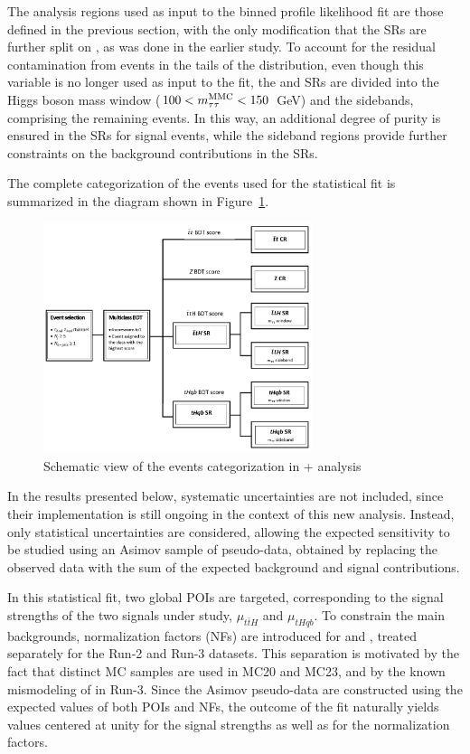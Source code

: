 The analysis regions used as input to the binned profile likelihood fit are those defined in the previous section, with the only modification that the SRs are further split on \mmc, as was done in the earlier study. To account for the residual contamination from \ttbar events in the tails of the \mmc distribution, even though this variable is no longer used as input to the fit, the \ttH and \thqb SRs are divided into the Higgs boson mass window ($100 < m^\text{MMC}_{\tau\tau} < 150$~GeV) and the sidebands, comprising the remaining events. In this way, an additional degree of purity is ensured in the SRs for signal events, while the sideband regions provide further constraints on the background contributions in the SRs.

The complete categorization of the events used for the statistical fit is summarized in the diagram shown in Figure~\ref{analysis_diagram}.
\begin{figure}[htbp]
  \centering
  \includegraphics[width=0.7\textwidth]{images/analysis_diagram.png}
    \caption{Schematic view of the events categorization in \tH + \ttH analysis}
    \label{analysis_diagram}
  \end{figure}

In the results presented below, systematic uncertainties are not included, since their implementation is still ongoing in the context of this new analysis. Instead, only statistical uncertainties are considered, allowing the expected sensitivity to be studied using an Asimov sample of pseudo-data, obtained by replacing the observed data with the sum of the expected background and signal contributions.

In this statistical fit, two global POIs are targeted, corresponding to the signal strengths of the two signals under study, $\mu_{t\bar{t}H}$ and $\mu_{tHqb}$. To constrain the main backgrounds, normalization factors (NFs) are introduced for \ztautau and \ttbar, treated separately for the Run-2 and Run-3 datasets. This separation is motivated by the fact that distinct \ttbar MC samples are used in MC20 and MC23, and by the known mismodeling of \ztautau in Run-3. Since the Asimov pseudo-data are constructed using the expected values of both POIs and NFs, the outcome of the fit naturally yields values centered at unity for the signal strengths as well as for the normalization factors.

